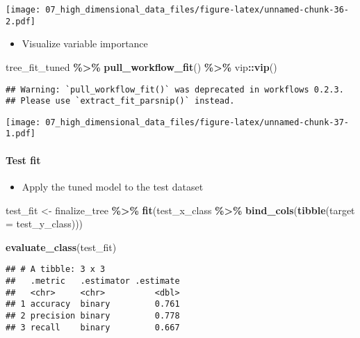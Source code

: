 \documentclass[
]{book}
\newenvironment{Shaded}{\begin{snugshade}}{\end{snugshade}}
\newcommand{\DataTypeTok}[1]{\textcolor[rgb]{0.13,0.29,0.53}{#1}}
\newcommand{\KeywordTok}[1]{\textcolor[rgb]{0.13,0.29,0.53}{\textbf{#1}}}
\newcommand{\NormalTok}[1]{#1}
\newcommand{\OperatorTok}[1]{\textcolor[rgb]{0.81,0.36,0.00}{\textbf{#1}}}
\newcommand{\StringTok}[1]{\textcolor[rgb]{0.31,0.60,0.02}{#1}}
\providecommand{\tightlist}{%
  \setlength{\itemsep}{0pt}\setlength{\parskip}{0pt}}
\begin{document}
\texttt{[image: 07\_high\_dimensional\_data\_files/figure-latex/unnamed-chunk-36-2.pdf]}

\begin{itemize}
\tightlist
\item
  Visualize variable importance
\end{itemize}

\begin{Shaded}
\begin{Highlighting}[]
\NormalTok{tree\_fit\_tuned }\OperatorTok{\%\textgreater{}\%}
\StringTok{  }\KeywordTok{pull\_workflow\_fit}\NormalTok{() }\OperatorTok{\%\textgreater{}\%}
\StringTok{  }\NormalTok{vip}\OperatorTok{::}\KeywordTok{vip}\NormalTok{()}
\end{Highlighting}
\end{Shaded}

\begin{verbatim}
## Warning: `pull_workflow_fit()` was deprecated in workflows 0.2.3.
## Please use `extract_fit_parsnip()` instead.
\end{verbatim}

\texttt{[image: 07\_high\_dimensional\_data\_files/figure-latex/unnamed-chunk-37-1.pdf]}

\hypertarget{test-fit-1}{%
\paragraph{Test fit}\label{test-fit-1}}

\begin{itemize}
\tightlist
\item
  Apply the tuned model to the test dataset
\end{itemize}

\begin{Shaded}
\begin{Highlighting}[]
\NormalTok{test\_fit \textless{}{-}}\StringTok{ }\NormalTok{finalize\_tree }\OperatorTok{\%\textgreater{}\%}
\StringTok{  }\KeywordTok{fit}\NormalTok{(test\_x\_class }\OperatorTok{\%\textgreater{}\%}\StringTok{ }\KeywordTok{bind\_cols}\NormalTok{(}\KeywordTok{tibble}\NormalTok{(}\DataTypeTok{target =}\NormalTok{ test\_y\_class)))}

\KeywordTok{evaluate\_class}\NormalTok{(test\_fit)}
\end{Highlighting}
\end{Shaded}

\begin{verbatim}
## # A tibble: 3 x 3
##   .metric   .estimator .estimate
##   <chr>     <chr>          <dbl>
## 1 accuracy  binary         0.761
## 2 precision binary         0.778
## 3 recall    binary         0.667
\end{verbatim}
\end{document}
